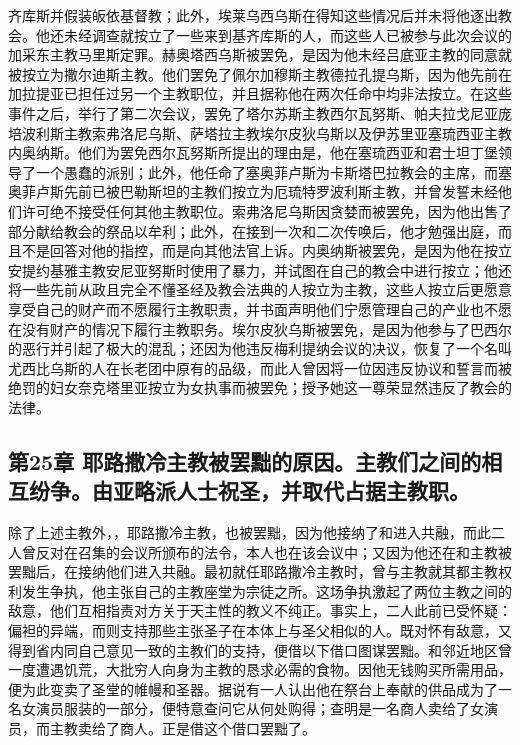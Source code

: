 齐库斯并假装皈依基督教；此外，埃莱乌西乌斯在得知这些情况后并未将他逐出教会。他还未经调查就按立了一些来到基齐库斯的人，而这些人已被参与此次会议的加采东主教马里斯定罪。赫奥塔西乌斯被罢免，是因为他未经吕底亚主教的同意就被按立为撒尔迪斯主教。他们罢免了佩尔加穆斯主教德拉孔提乌斯，因为他先前在加拉提亚已担任过另一个主教职位，并且据称他在两次任命中均非法按立。在这些事件之后，举行了第二次会议，罢免了塔尔苏斯主教西尔瓦努斯、帕夫拉戈尼亚庞培波利斯主教索弗洛尼乌斯、萨塔拉主教埃尔皮狄乌斯以及伊苏里亚塞琉西亚主教内奥纳斯。他们为罢免西尔瓦努斯所提出的理由是，他在塞琉西亚和君士坦丁堡领导了一个愚蠢的派别；此外，他任命了塞奥菲卢斯为卡斯塔巴拉教会的主席，而塞奥菲卢斯先前已被巴勒斯坦的主教们按立为厄琉特罗波利斯主教，并曾发誓未经他们许可绝不接受任何其他主教职位。索弗洛尼乌斯因贪婪而被罢免，因为他出售了部分献给教会的祭品以牟利；此外，在接到一次和二次传唤后，他才勉强出庭，而且不是回答对他的指控，而是向其他法官上诉。内奥纳斯被罢免，是因为他在按立安提约基雅主教安尼亚努斯时使用了暴力，并试图在自己的教会中进行按立；他还将一些先前从政且完全不懂圣经及教会法典的人按立为主教，这些人按立后更愿意享受自己的财产而不愿履行主教职责，并书面声明他们宁愿管理自己的产业也不愿在没有财产的情况下履行主教职务。埃尔皮狄乌斯被罢免，是因为他参与了巴西尔的恶行并引起了极大的混乱；还因为他违反梅利提纳会议的决议，恢复了一个名叫尤西比乌斯的人在长老团中原有的品级，而此人曾因将一位因违反协议和誓言而被绝罚的妇女奈克塔里亚按立为女执事而被罢免；授予她这一尊荣显然违反了教会的法律。\par


\subsection{第25章 耶路撒冷主教被罢黜的原因。主教们之间的相互纷争。由亚略派人士祝圣，并取代占据主教职。}

除了上述主教外，，耶路撒冷主教，也被罢黜，因为他接纳了和进入共融，而此二人曾反对在召集的会议所颁布的法令，本人也在该会议中；又因为他还在和主教被罢黜后，在接纳他们进入共融。最初就任耶路撒冷主教时，曾与主教就其都主教权利发生争执，他主张自己的主教座堂为宗徒之所。这场争执激起了两位主教之间的敌意，他们互相指责对方关于天主性的教义不纯正。事实上，二人此前已受怀疑：偏袒的异端，而则支持那些主张圣子在本体上与圣父相似的人。既对怀有敌意，又得到省内同自己意见一致的主教们的支持，便借以下借口图谋罢黜。和邻近地区曾一度遭遇饥荒，大批穷人向身为主教的恳求必需的食物。因他无钱购买所需用品，便为此变卖了圣堂的帷幔和圣器。据说有一人认出他在祭台上奉献的供品成为了一名女演员服装的一部分，便特意查问它从何处购得；查明是一名商人卖给了女演员，而主教卖给了商人。正是借这个借口罢黜了。\par


